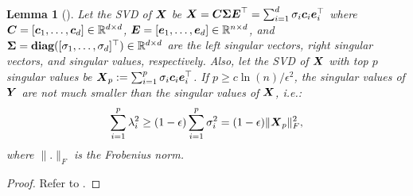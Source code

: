 \documentclass{article}
\newtheorem{lemma}{Lemma}
\def\b{\ensuremath\boldsymbol}
\begin{document}
\begin{lemma}[{\citep[Lemma 3]{papadimitriou2000latent}}]
Let the SVD of $\b{X}$ be $\b{X} = \b{C} \b{\Sigma} \b{E}^\top = \sum_{i=1}^{d} \sigma_i \b{c}_i \b{e}_i^\top$ where $\b{C} = [\b{c}_1, \dots, \b{c}_{d}] \in \mathbb{R}^{d \times d}$, $\b{E} = [\b{e}_1, \dots, \b{e}_{d}] \in \mathbb{R}^{n \times d}$, and $\b{\Sigma} = \textbf{diag}([\sigma_1, \dots, \sigma_{d}]^\top) \in \mathbb{R}^{d \times d}$ are the left singular vectors, right singular vectors, and singular values, respectively. 
Also, let the SVD of $\b{X}$ with top $p$ singular values be $\b{X}_p := \sum_{i=1}^{p} \sigma_i \b{c}_i \b{e}_i^\top$. 
If $p \geq c \ln(n) / \epsilon^2$, the singular values of $\b{Y}$ are not much smaller than the singular values of $\b{X}$, i.e.:
\begin{align}\label{equation_lowRankApprox_lambda_squared_geq}
\sum_{i=1}^p \lambda_i^2 \geq (1 - \epsilon) \sum_{i=1}^p \sigma_i^2 = (1 - \epsilon) \|\b{X}_p\|_F^2,
\end{align}
where $\|.\|_F$ is the Frobenius norm. 
\end{lemma}
\begin{proof}
Refer to {\citep[Appendix]{papadimitriou2000latent}}.
\end{proof}
\end{document}
